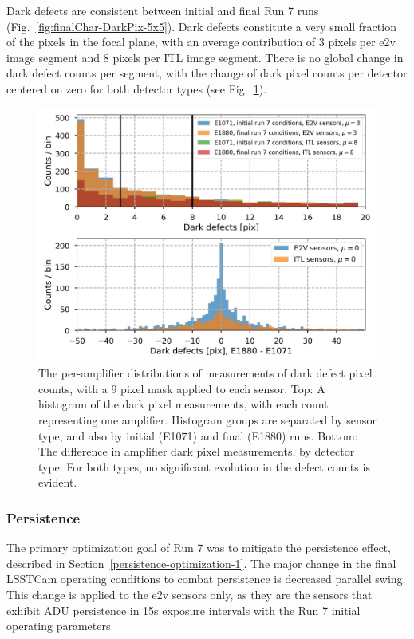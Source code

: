 Dark defects are consistent between initial and final Run 7 runs (Fig.~\ref{fig:finalChar-DarkPix-5x5}). Dark defects constitute a very small fraction of the pixels in the focal plane, with an average contribution of 3 pixels per e2v image segment and 8 pixels per ITL image segment. There is no global change in dark defect counts per segment, with the change of 
dark pixel counts per detector centered on zero for both detector types (see Fig.~\ref{fig:finalChar:darkDefectsComparison}). 

\begin{figure}[ht]
    \centering
    \includegraphics[width=0.9\linewidth]{figures/finalCharacterization/darkDefects_comparison_final.jpg}
    \caption{The per-amplifier distributions of measurements of dark defect pixel counts, with a 9 pixel mask applied to each sensor. Top: A histogram of the dark pixel measurements, with each count representing one amplifier. Histogram groups are separated by sensor type, and also by initial (E1071) and final (E1880) runs. Bottom: The difference in amplifier dark pixel measurements, by detector type. For both types, no significant evolution in the defect counts is evident.}
    \label{fig:finalChar:darkDefectsComparison}
\end{figure}

\clearpage
\subsubsection{Persistence}\label{final-persistence}

The primary optimization goal of Run 7 was to mitigate the persistence effect, described in Section~\ref{persistence-optimization-1}. The major change in the final LSSTCam operating conditions to combat persistence is decreased parallel swing. This change is applied to the e2v sensors only, as they are the sensors that exhibit  ADU persistence in 15s exposure intervals with the Run 7 initial operating parameters.

